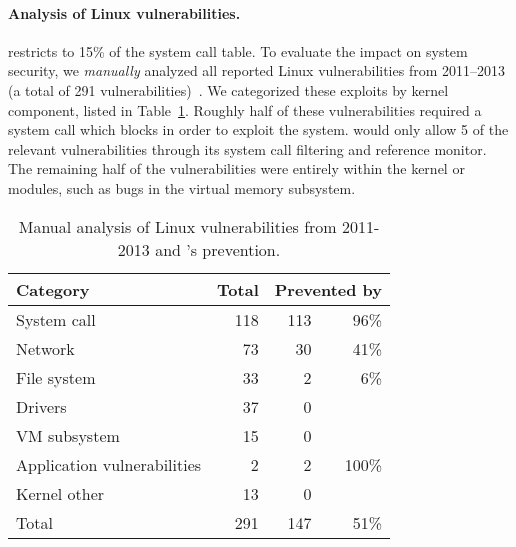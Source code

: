 \paragraph{Analysis of Linux vulnerabilities.}
\graphene{} restricts \picoprocs{} to 15\% of the system call table.
To evaluate the impact on system security,
we \emph{manually} analyzed
all reported Linux vulnerabilities from 2011--2013 (a total
of 291 vulnerabilities)~\cite{linuxvuln}.
We categorized these exploits by kernel component, listed in Table~\ref{table:vulnerabilities}.
Roughly half of these vulnerabilities required a system
call  which \graphene{} blocks in order to exploit the system.
\graphene{} would only allow 5 of the relevant vulnerabilities
through its system call filtering and reference monitor.
The remaining half of the vulnerabilities were entirely within the kernel or modules,
    such as bugs in the virtual memory subsystem.

\begin{table}[t!b!]
\footnotesize
\centering
\begin{tabular}{|l|r|rr|}
\hline
{\bf Category } & {\bf Total} & \multicolumn{2}{|c|}{{\bf Prevented by \graphene{}}}\\

\hline
System call      & 118        &   \hspace{0.2in} 113 &96\% \\\hline 
Network          & 73         &   \hspace{0.2in}30 & 41\% \\\hline 
File system      & 33         &  \hspace{0.2in} 2  & 6\% \\\hline 
Drivers          & 37         &   \hspace{0.2in} 0 &\\\hline 
VM subsystem     & 15         &   \hspace{0.2in} 0 &\\\hline 
Application vulnerabilities & 2   & \hspace{0.2in} 2 & 100\% \\\hline 
Kernel other     & 13      & \hspace{0.2in} 0 &\\\hline 
Total            & 291     & \hspace{0.2in} 147 & 51\% \\\hline 
\end{tabular}
\caption[Analysis of Linux vulnerabilities prevented by \graphene{}]
{Manual analysis of Linux vulnerabilities from 2011-2013 and \graphene{}'s prevention.}
\label{table:vulnerabilities}
\end{table}


